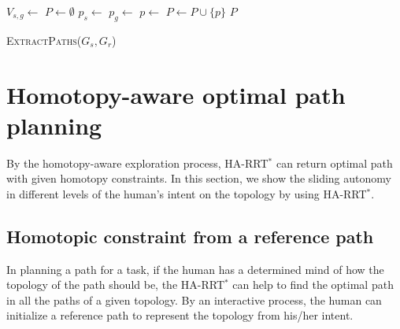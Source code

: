 \documentclass[letterpaper, 10 pt, conference]{ieeeconf}
\begin{document}
\begin{algorithm}[hbtp]
	\begin{algorithmic}[1]
		\State $ V_{s,g} \leftarrow $ 
		\State $ P \leftarrow \emptyset $
			\State $ p_{s} \leftarrow $ 
			\State $ p_{g} \leftarrow $ 
			\State $ p \leftarrow $ 
			\State $ P \leftarrow P \cup \{ p \} $
		\EndFor
		\Return $ P $
	\end{algorithmic}
	\caption{ \textsc{ExtractPaths}($ G_{s}, G_{r} $) }
	\label{alg:harrt:binding}
\end{algorithm}

\section{Homotopy-aware optimal path planning}
\label{sec:application}

By the homotopy-aware exploration process, HA-RRT$^{*}$ can return optimal path with given homotopy constraints.
In this section, we show the sliding autonomy in different levels of the human's intent on the topology by using HA-RRT$^{*}$.

\subsection{Homotopic constraint from a reference path}

In planning a path for a task, if the human has a determined mind of how the topology of the path should be, the HA-RRT$^{*}$ can help to find the optimal path in all the paths of a given topology.
By an interactive process, the human can initialize a reference path to represent the topology from his/her intent.
\end{document}
